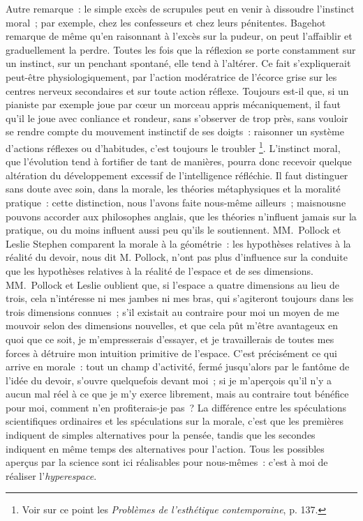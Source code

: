 \documentclass[french,twoside]{book} %
\begin{document}
Autre remarque : le simple excès de scrupules peut en venir à dissoudre l’instinct moral ; par exemple, chez les confesseurs et chez leurs pénitentes. Bagehot remarque de même qu’en raisonnant à l’excès sur la pudeur, on peut l’affaiblir et graduellement la perdre. Toutes les fois que la réflexion se porte constamment sur un instinct, sur un penchant spontané, elle tend à l’altérer. Ce fait s’expliquerait peut-être physiologiquement, par l’action modératrice de l’écorce grise sur les centres nerveux secondaires et sur toute action réflexe. Toujours est-il que, si un pianiste par exemple joue par cœur un morceau appris mécaniquement, il faut qu’il le joue avec conliance et rondeur, sans s’observer de trop près, sans vouloir se rendre compte du mouvement instinctif de ses doigts : raisonner un système d’actions réflexes ou d’habitudes, c’est toujours le troubler \footnote{Voir sur ce point les \emph{Problèmes de l’esthétique contemporaine}, p. 137.}. L’instinct moral, que l’évolution tend à fortifier de tant de manières, pourra donc recevoir quelque altération du développement excessif de l’intelligence réfléchie. Il faut distinguer sans doute avec soin, dans la morale, les théories métaphysiques et la moralité pratique : cette distinction, nous l’avons faite nous-même ailleurs ; maisnousne pouvons accorder aux philosophes anglais, que les théories n’influent jamais sur la pratique, ou du moins influent aussi peu qu’ils le soutiennent. MM. Pollock et Leslie Stephen comparent la morale à la géométrie : les hypothèses relatives à la réalité du devoir, nous dit M. Pollock, n’ont pas plus d’influence sur la conduite que les hypothèses relatives à la réalité de l’espace et de ses dimensions. MM. Pollock et Leslie oublient que, si l’espace a quatre dimensions au lieu de trois, cela n’intéresse ni mes jambes ni mes bras, qui s’agiteront toujours dans les trois dimensions connues ; s’il existait au contraire pour moi un moyen de me mouvoir selon des dimensions nouvelles, et que cela pût m’être avantageux en quoi que ce soit, je m’empresserais d’essayer, et je travaillerais de toutes mes forces à détruire mon intuition primitive de l’espace. C’est précisément ce qui arrive en morale : tout un champ d’activité, fermé jusqu’alors par le fantôme de l’idée du devoir, s’ouvre quelquefois devant moi ; si je m’aperçois qu’il n’y a aucun mal réel à ce que je m’y exerce librement, mais au contraire tout bénéfice pour moi, comment n’en profiterais-je pas ? La différence entre les spéculations scientifiques ordinaires et les spéculations sur la morale, c’est que les premières indiquent de simples alternatives pour la pensée, tandis que les secondes indiquent en même temps des alternatives pour l’action. Tous les possibles aperçus par la science sont ici réalisables pour nous-mêmes : c’est à moi de réaliser l’\emph{hyperespace}.\par
\end{document}
